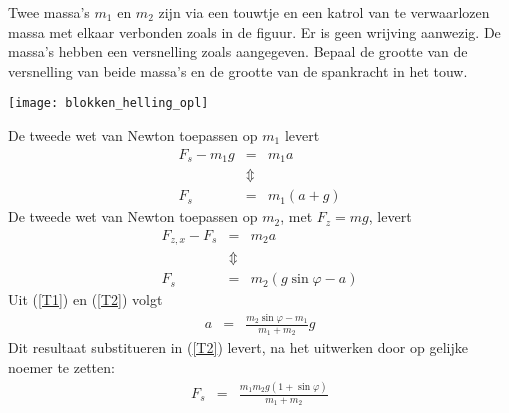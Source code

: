 \documentclass{ximera}
\begin{document}
	
	\begin{exercise}
	Twee massa's $m_1$ en $m_2$ zijn via een touwtje en een katrol van te verwaarlozen massa met elkaar verbonden zoals in de figuur. Er is geen wrijving aanwezig. De massa's hebben een versnelling zoals aangegeven.
	Bepaal de grootte van de versnelling van beide massa's en de grootte van de spankracht in het touw.
	\begin{image}
	\texttt{[image: blokken\_helling\_opl]}
	\end{image}

	\begin{oplossing}
	De tweede wet van Newton toepassen op $m_1$ levert
	\begin{eqnarray}
	F_s-m_1g&=&m_1a\nonumber\\
	&\Updownarrow&\nonumber\\
	F_s&=&m_1(a+g)\label{T1}
	\end{eqnarray}
	De tweede wet van Newton toepassen op $m_2$, met $F_z=mg$, levert
	\begin{eqnarray}
	F_{z,x}-F_s&=&m_2a\nonumber\\
	&\Updownarrow&\nonumber\\
	F_s&=&m_2(g\sin{\varphi}-a)\label{T2}
	\end{eqnarray}
	Uit (\ref{T1}) en (\ref{T2}) volgt
	\begin{eqnarray}
	a&=&\frac{m_2\sin{\varphi}-m_1}{m_1+m_2}g\nonumber
	\end{eqnarray}
	Dit resultaat substitueren in (\ref{T2}) levert, na het uitwerken door op ge\-lij\-ke noemer te zetten:
	\begin{eqnarray}
	F_s&=&\frac{m_1m_2g(1+\sin{\varphi})}{m_1+m_2}\nonumber
	\end{eqnarray}
	\end{oplossing}
	\end{exercise}
	
	
	
\end{document}
